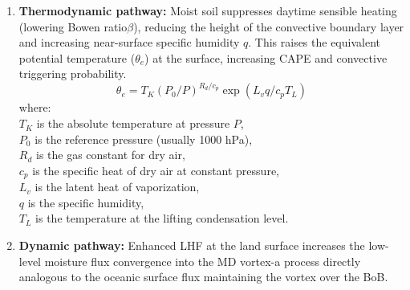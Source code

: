 \clearpage
\begin{enumerate}
  \item \textbf{Thermodynamic pathway:} Moist soil suppresses daytime
    sensible heating (lowering Bowen ratio$\beta$), reducing the height of the
    convective boundary layer and increasing near-surface specific humidity $q$.
    This raises the equivalent potential temperature ($\theta_e$)
    \citep{bolton1980computation} at the surface, increasing CAPE and
    convective triggering probability.
    \begin{equation}
      \theta_e = T_K(P_0/P)^{R_d/c_p}\exp(L_v q / c_p T_L)
    \end{equation}
    where:\\
    $T_K$ is the absolute temperature at pressure $P$, \\
    $P_0$ is the reference pressure (usually 1000 hPa), \\
    $R_d$ is the gas constant for dry air, \\
    $c_p$ is the specific heat of dry air at constant pressure, \\
    $L_v$ is the latent heat of vaporization, \\
    $q$ is the specific humidity, \\
    $T_L$ is the temperature at the lifting condensation level.
  \item \textbf{Dynamic pathway:} Enhanced LHF at the land surface
    increases the low-level moisture flux convergence into the MD
    vortex-a process directly analogous to the oceanic surface flux
    maintaining the vortex over the BoB.
\end{enumerate}

%
%

